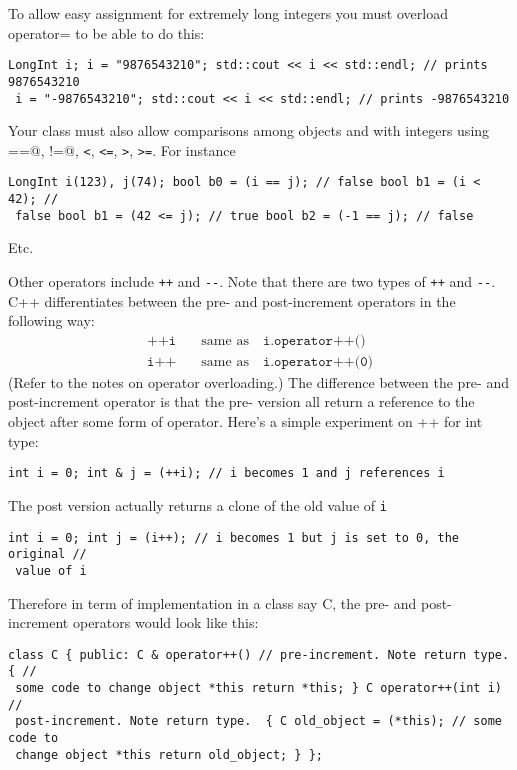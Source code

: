To allow easy assignment for extremely long integers you must overload
operator= to be able to do this:
\begin{Verbatim}[fontsize=\footnotesize,frame=single]
LongInt i; i = "9876543210"; std::cout << i << std::endl; // prints 9876543210
 i = "-9876543210"; std::cout << i << std::endl; // prints -9876543210
\end{Verbatim}

Your class must also allow comparisons among objects and with integers using
\verb@==@, \verb@!=@, \verb!<!, \verb!<=!, \verb!>!, \verb!>=!.  For instance
\begin{Verbatim}[fontsize=\footnotesize,frame=single]
LongInt i(123), j(74); bool b0 = (i == j); // false bool b1 = (i < 42); //
 false bool b1 = (42 <= j); // true bool b2 = (-1 == j); // false
\end{Verbatim}

Etc.

Other operators include \verb!++! and \verb!--!. Note that there are two types
of \verb!++! and \verb!--!. C++ differentiates between the pre- and
post-increment operators in the following way:
\begin{align*}
\texttt{++i} \,\,\,\, &\text{ same as } \,\,\,\, \texttt{i.operator++()}
\\ \texttt{i++} \,\,\,\, &\text{ same as } \,\,\,\, \texttt{i.operator++(0)}
\end{align*}
(Refer to the notes on operator overloading.) The difference between the pre-
and post-increment operator is that the pre- version all return a reference to
the object after some form of operator. Here's a simple experiment on ++ for
int type:

\begin{Verbatim}[fontsize=\footnotesize,frame=single]
int i = 0; int & j = (++i); // i becomes 1 and j references i
\end{Verbatim}

The post version actually returns a clone of the old value of \verb!i!

\begin{Verbatim}[fontsize=\footnotesize,frame=single]
int i = 0; int j = (i++); // i becomes 1 but j is set to 0, the original //
 value of i
\end{Verbatim}

Therefore in term of implementation in a class say C, the pre- and
post-increment operators would look like this:

\begin{Verbatim}[fontsize=\footnotesize,frame=single]
class C { public: C & operator++() // pre-increment. Note return type.  { //
 some code to change object *this return *this; } C operator++(int i) //
 post-increment. Note return type.  { C old_object = (*this); // some code to
 change object *this return old_object; } };
\end{Verbatim}

